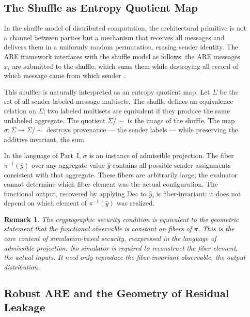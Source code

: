 \documentclass[12pt, a4paper]{article}
\theoremstyle{essaystyle}
\newtheorem*{remark}{Remark}
\begin{document}
\subsection{The Shuffle as Entropy Quotient Map}

In the shuffle model of distributed computation, the architectural primitive is not a
channel between parties but a mechanism that receives all messages and delivers them in
a uniformly random permutation, erasing sender identity. The ARE framework interfaces
with the shuffle model as follows: the ARE messages $\hat{x}_i$ are submitted to the
shuffle, which sums them while destroying all record of which message came from which
sender \citep{halevi2023additive}.

This shuffler is naturally interpreted as an entropy quotient map. Let $\Sigma$ be the
set of all sender-labeled message multisets. The shuffle defines an equivalence relation
on $\Sigma$: two labeled multisets are equivalent if they produce the same unlabeled
aggregate. The quotient $\Sigma/{\sim}$ is the image of the shuffle. The map
$\sigma : \Sigma \to \Sigma/{\sim}$ destroys provenance --- the sender labels ---
while preserving the additive invariant, the sum.

In the language of Part~I, $\sigma$ is an instance of admissible projection. The fiber
$\pi^{-1}(\hat{y})$ over any aggregate value $\hat{y}$ contains all possible sender
assignments consistent with that aggregate. These fibers are arbitrarily large; the
evaluator cannot determine which fiber element was the actual configuration. The
functional output, recovered by applying $\mathrm{Dec}$ to $\hat{y}$, is
fiber-invariant: it does not depend on which element of $\pi^{-1}(\hat{y})$ was
realized.

\begin{remark}
The cryptographic security condition is equivalent to the geometric statement that the
functional observable is constant on fibers of $\pi$. This is the core content of
simulation-based security, reexpressed in the language of admissible projection. No
simulator is required to reconstruct the fiber element, the actual inputs. It need only
reproduce the fiber-invariant observable, the output distribution.
\end{remark}

\subsection{Robust ARE and the Geometry of Residual Leakage}
\end{document}
